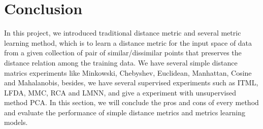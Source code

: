 \documentclass[conference]{IEEEtran}
\begin{document}
\section{Conclusion}

In this project, we introduced traditional distance metric and several metric learning method, which is to learn a distance metric for the input space of data from a given collection of pair of similar/dissimilar points that preserves the distance relation among the training data. We have several simple distance matrics experiments like Minkowski, Chebyshev, Euclidean, Manhattan, Cosine and Mahalanobis, besides, we have several supervised experiments such as ITML, LFDA, MMC, RCA and LMNN, and give a experiment with unsupervised method PCA. In this section, we will conclude the pros and cons of every method and evaluate the performance of simple distance metrics and metrics learning models.




\end{document}
